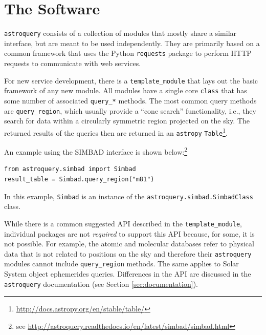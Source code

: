 \documentclass[twocolumn]{aastex62}
\newcommand{\package}[1]{\texttt{#1}\xspace}
\newcommand{\astroquery}{\package{astroquery}}
\newcommand{\astropypkg}{\package{astropy}}
\begin{document}


\section{The Software}
\label{sec:software}
\astroquery consists of a collection of modules that mostly share a similar
interface, but are meant to be used independently.  They are primarily based on
a common framework that uses the Python \package{requests} package to perform
HTTP requests to communicate with web services.

For new service development, there is a \texttt{template\_module} that lays
out the basic framework of any new module.  All modules have a single core
\texttt{class} that has some number of associated \texttt{query\_*} methods.
The most common query methods are \texttt{query\_region}, which usually
provide a ``cone search'' functionality, i.e., they search for data within a
circularly symmetric region projected on the sky. The returned results of
the queries then are returned in an \astropypkg
\citep{Astropy-Collaboration2018, Astropy-Collaboration2013}
\texttt{Table}\footnote{\url{http://docs.astropy.org/en/stable/table/}}.

An example using the SIMBAD interface is shown below:\footnote{see
\url{http://astroquery.readthedocs.io/en/latest/simbad/simbad.html}}
\begin{lstlisting}[caption=Query SIMBAD for a region around M81]
from astroquery.simbad import Simbad
result_table = Simbad.query_region("m81")
\end{lstlisting}
In this example, \texttt{Simbad} is an instance of the
\texttt{astroquery.simbad.SimbadClass} class.

While there is a common suggested API described in the \texttt{template\_module},
individual packages are not \emph{required} to support this API because, for
some, it is not possible.  For example, the atomic and molecular databases refer
to physical data that is not related to positions on the sky and therefore
their \astroquery modules cannot include \texttt{query\_region} methods. The
same applies to Solar System object ephemerides queries. Differences in the API
are discussed in the \astroquery documentation (see Section
\ref{sec:documentation}).
\end{document}
